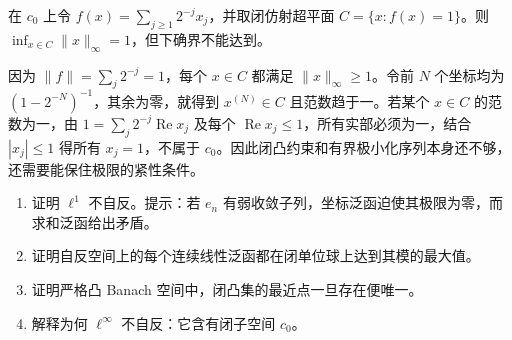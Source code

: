 \begin{example}[缺少自反性时的闭凸极小化问题]
在 $c_0$ 上令 $f(x)=\sum_{j\geq1}2^{-j}x_j$，并取闭仿射超平面 $C=\{x:f(x)=1\}$。则 $\inf_{x\in C}\|x\|_\infty=1$，但下确界不能达到。
\end{example}
\begin{solve}
因为 $\|f\|=\sum_j2^{-j}=1$，每个 $x\in C$ 都满足 $\|x\|_\infty\geq1$。令前 $N$ 个坐标均为 $(1-2^{-N})^{-1}$，其余为零，就得到 $x^{(N)}\in C$ 且范数趋于一。若某个 $x\in C$ 的范数为一，由 $1=\sum_j2^{-j}\operatorname{Re}x_j$ 及每个 $\operatorname{Re}x_j\leq1$，所有实部必须为一，结合 $|x_j|\leq1$ 得所有 $x_j=1$，不属于 $c_0$。因此闭凸约束和有界极小化序列本身还不够，还需要能保住极限的紧性条件。
\end{solve}
\begin{enumerate}
 \item 证明 $\ell^1$ 不自反。提示：若 $e_n$ 有弱收敛子列，坐标泛函迫使其极限为零，而求和泛函给出矛盾。
 \item\label{exer:fa-norm-attainment} 证明自反空间上的每个连续线性泛函都在闭单位球上达到其模的最大值。
 \item 证明严格凸 Banach 空间中，闭凸集的最近点一旦存在便唯一。
 \item 解释为何 $\ell^\infty$ 不自反：它含有闭子空间 $c_0$。
\end{enumerate}

